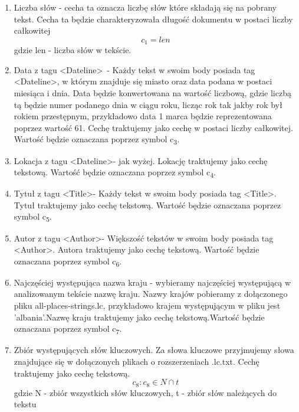 \documentclass{classrep}
\begin{document}
\begin{enumerate}
  \item Liczba słów - cecha ta oznacza liczbę słów które składają się na pobrany tekst. Cecha ta będzie charakteryzowała długość dokumentu w postaci liczby całkowitej \begin{equation}  c_1 = len \end{equation} gdzie len - liczba słów w tekście.\\
 
 
 \item Data z tagu  \textless Dateline\textgreater\ - Każdy tekst w swoim body posiada tag \textless Dateline\textgreater , w którym znajduje się miasto oraz data podana w postaci miesiąca i dnia. Data będzie konwertowana na wartość liczbową, gdzie liczbą tą będzie numer podanego dnia w ciągu roku, licząc rok tak jakby rok był rokiem przestępnym, przykładowo data 1 marca będzie reprezentowana poprzez wartość 61. Cechę traktujemy jako cechę w postaci liczby całkowitej. Wartość będzie oznaczana poprzez symbol  c\textsubscript{3}.    \\
  \item Lokacja z tagu \textless Dateline\textgreater - jak wyżej. Lokację traktujemy jako cechę tekstową. Wartość będzie oznaczana poprzez symbol  c\textsubscript{4}. \\
  \item Tytuł z tagu \textless Title\textgreater - Każdy tekst w swoim body posiada tag \textless Title\textgreater. Tytuł traktujemy jako cechę tekstową. Wartość będzie oznaczana poprzez symbol  c\textsubscript{5}.\\
  \item Autor z tagu \textless Author\textgreater - Większość tekstów w swoim body posiada tag \textless Author\textgreater. Autora traktujemy jako cechę tekstową. Wartość będzie oznaczana poprzez symbol  c\textsubscript{6}.\\
  \item Najczęściej występująca nazwa kraju - wybieramy najczęściej występującą w analizowanym tekście nazwę kraju. Nazwy krajów pobieramy z dołączonego pliku all-places-strings.lc, przykładowo krajem występującym w pliku jest 'albania'.Nazwę kraju traktujemy jako cechę tekstową.Wartość będzie oznaczana poprzez symbol  c\textsubscript{7}.\\
  \item Zbiór występujących słów kluczowych. Za słowa kluczowe przyjmujemy słowa znajdujące się w dołączonych plikach o rozszerzeniach .lc.txt. Cechę traktujemy jako cechę tekstową.  \begin{equation}  c_8 : c_8 \in N \cap t \end{equation} gdzie N - zbiór wszystkich słów kluczowych, t - zbiór słów należących do tekstu\\

\end{enumerate}
\end{document}
